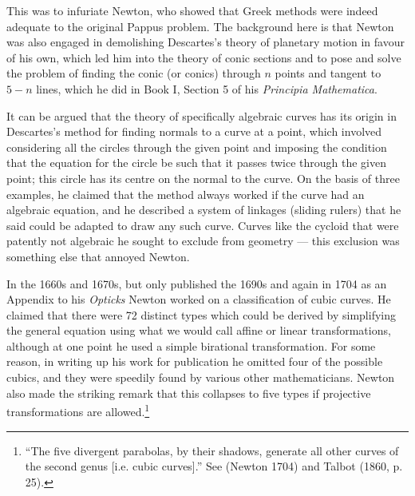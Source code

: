 This was to infuriate Newton, who showed that Greek methods were indeed adequate to the original Pappus problem. The background here is that Newton was also engaged in demolishing Descartes's theory of planetary motion in favour of his own, which led him into the theory of conic sections and to pose and solve the problem of finding the conic (or conics) through $n$ points and tangent to $5-n$ lines, which he did in Book I, Section 5 of his \emph{Principia Mathematica}.~\label{Newtonconics}

It can be argued that the theory of specifically algebraic curves has its origin in Descartes's method for finding normals to a curve at a point, which  involved considering all the circles through the given point and imposing the condition that the equation for the circle be such that it passes twice through the given point; this circle has its centre on the normal to the curve. On the basis of three examples, he claimed that the method always worked  if the curve had an algebraic equation, and he described a system of linkages (sliding rulers) that he said could be adapted to draw any such curve. Curves like the cycloid that were patently not algebraic he sought to exclude from geometry --- this exclusion was something else that annoyed Newton.

In the 1660s and 1670s, but only published  the 1690s and again in 1704 as an Appendix to his \emph{Opticks} Newton worked on a classification of cubic curves. He claimed that there were 72 distinct types which could be derived by simplifying the general equation using what we would call affine or linear transformations, although at one point he used a simple birational transformation. For some reason, in writing up his work for publication he omitted four of the possible cubics, and they were speedily found by various other mathematicians.  Newton also made the striking remark that this collapses to five types if projective transformations are allowed.\footnote{``The five divergent parabolas, by their shadows, generate all other curves of the second genus [i.e. cubic curves].'' See (Newton  1704) and Talbot (1860, p. 25).}






